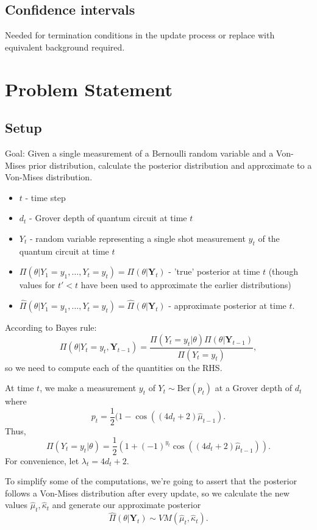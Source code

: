 \documentclass[]{report}
\begin{document}
\section{Confidence intervals}
Needed for termination conditions in the update process or replace with equivalent background required.
\chapter{Problem Statement}
\section{Setup}
Goal: Given a single measurement of a Bernoulli random variable and a Von-Mises prior distribution, calculate the posterior distribution and approximate to a Von-Mises distribution.

\begin{itemize}
	\item $t$ - time step
	\item $d_t$ - Grover depth of quantum circuit at time $t$
	\item $Y_t$ - random variable representing a single shot measurement $y_t$ of the quantum circuit at time $t$
	\item $\Pi(\theta| Y_1 = y_1, \ldots, Y_t = y_t) = \Pi(\theta | \mathbf{Y}_t )$ - 'true' posterior at time $t$ (though values for $t ' < t$ have been used to approximate the earlier distributions)
	\item  $\hat{\Pi}(\theta| Y_1 = y_1, \ldots, Y_t = y_t) = \hat{\Pi}(\theta | \mathbf{Y}_t )$ - approximate posterior at time $t$.
\end{itemize}

According to Bayes rule:
\[
\Pi (\theta | Y_t = y_t, \mathbf{Y}_{t -1}) = \frac{\Pi(Y_t = y_t | \theta) \Pi(\theta | \mathbf{Y}_{t-1})}{\Pi(Y_t = y_t) },
\]
so we need to compute each of the quantities on the RHS.

At time $t$, we make a measurement $y_t$ of $Y_t \sim \text{Ber}(p_t)$ at a Grover depth of $d_t$ where
\[
	p_t = \frac{1}{2}(1 - \cos((4d_t + 2) \hat{\mu}_{t-1}).
\]
Thus,
\[
\Pi(Y_t = y_t | \theta) =  \frac{1}{2}(1 + (-1)^{y_t} \cos((4d_t + 2) \hat{\mu}_{t-1})).
\]
For convenience, let $\lambda_t = 4d_t + 2$.

To simplify some of the computations, we're going to assert that the posterior follows a Von-Mises distribution after every update, so we calculate the new values $\hat{\mu}_t, \hat{\kappa}_t$ and generate our approximate posterior
\[
\hat{\Pi}(\theta | \mathbf{Y}_t )  \sim VM(\hat{\mu}_t, \hat{\kappa}_t).
\]
\end{document}
